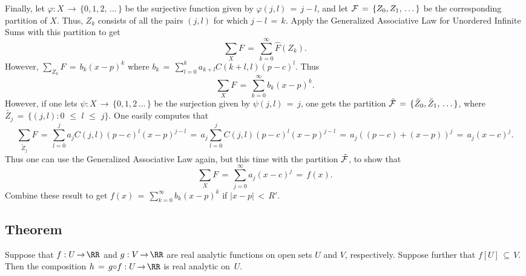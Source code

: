         Finally, let ${\varphi}:X \,{\rightarrow}\, \{0,1,2,\,{\ldots}\,\}$ be the surjective function given by ${\varphi}(j,l) \,=\, j-l$, and let ${\cal F} \,=\, \{Z_{0},Z_{1},\,{\ldots}\,\}$ be the corresponding partition of $X$.
    Thus, $Z_{k}$ consists of all the pairs $(j,l)$ for which $j-l \,=\, k$.
    Apply the Generalized Associative Law for Unordered Infinite Sums with this partition to get
        \begin{displaymath}
        \sum_{X} F \,=\, \sum_{k=0}^{{\infty}} \hat{F}(Z_{k}).
        \end{displaymath}
    However, ${\displaystyle \sum_{Z_{k}} F \,=\, b_{k}(x-p)^{k}}$ where $b_{k} \,=\, \sum_{l=0}^{k} a_{k+l}C(k+l,l)(p-c)^{l}$.
    Thus
        \begin{displaymath}
        \sum_{X} F \,=\, \sum_{k=0}^{{\infty}} b_{k}(x-p)^{k}.
        \end{displaymath}
    However, if one lets ${\psi}:X \,{\rightarrow}\, \{0,1,2\,{\ldots}\,\}$ be the surjection given by ${\psi}(j,l) \,=\, j$,
    one gets the partition $\tilde{{\cal F}} \,=\, \{\tilde{Z}_{0},\tilde{Z}_{1},\,{\ldots}\,\}$,
    where $\tilde{Z_{j}} \,=\, \{(j,l): 0\,\,{\leq}\,\,l\,\,{\leq}\,\,j\}$.
    One easily computes that
        \begin{displaymath}
        \sum_{\tilde{Z}_{j}} F \,=\, \sum_{l=0}^{j} a_{j}C(j,l)(p-c)^{l}(x-p)^{j-l} \,=\, a_{j}\sum_{l=0}^{j} C(j,l)(p-c)^{l}(x-p)^{j-l}
     \,=\, a_{j}((p-c) + (x-p))^{j} \,=\, a_{j}(x-c)^{j}.
        \end{displaymath}
    Thus one can use the Generalized Associative Law again, but this time with the partition $\tilde{{\cal F}}$, to show that
        \begin{displaymath}
        \sum_{X} F \,=\, \sum_{j=0}^{{\infty}} a_{j}(x-c)^{j} \,=\, f(x).
        \end{displaymath}
    Combine these result to get $f(x) \,=\, \sum_{k=0}^{{\infty}} b_{k}(x-p)^{k}$ if $|x-p|\,<\,R'$.

\V
\V

        \subsection{\small{{\bf Theorem}}}
        \label{ThmG60.140}

\V

        Suppose that $f:U \,{\rightarrow}\, {\RR}$ and $g:V \,{\rightarrow}\, {\RR}$ are real analytic functions on open sets $U$ and $V$, respectively.
    Suppose further that $f[U] \,{\subseteq}\, V$.
    Then the composition $h \,=\, g{\circ}f:U \,{\rightarrow}\, {\RR}$ is real analytic on~$U$.


